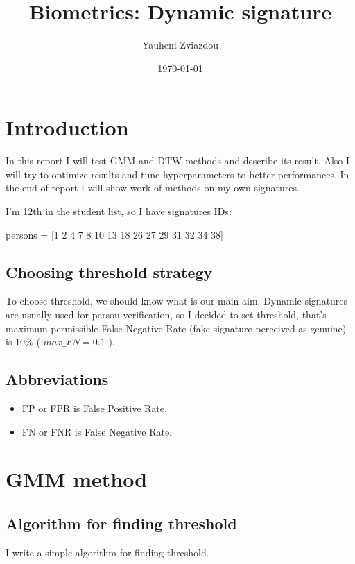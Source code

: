 \documentclass{article}
\title{Biometrics: Dynamic signature}
\author{Yauheni Zviazdou}
\date{\today}
\begin{document}
\maketitle


\section{Introduction}

In this report I will test GMM and DTW methods and describe its result. 
Also I will try to optimize results and tune hyperparameters to better performances. 
In the end of report I will show work of methods on my own signatures.

I'm 12th in the student list, so I have signatures IDs:

persons = [1 2 4 7 8 10 13 18 26 27 29 31 32 34 38]

\subsection{Choosing threshold strategy}

To choose threshold, we should know what is our main aim. 
Dynamic signatures are usually used for person verification, so I decided to set threshold, that's maximum permissible False Negative Rate (fake signature perceived as genuine) is 10\% ( \(max\_FN = 0.1\) ).


\subsection{Abbreviations}

\begin{itemize}
    \item FP or FPR is False Positive Rate.
    \item FN or FNR is False Negative Rate.
\end{itemize}

\section{GMM method}

\subsection{Algorithm for finding threshold}

I write a simple algorithm for finding threshold.
\end{document}
